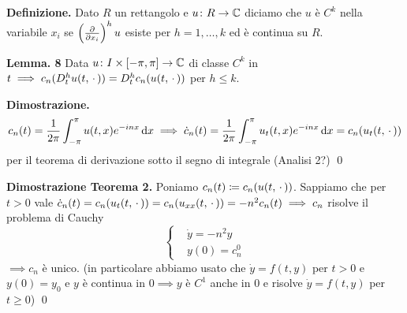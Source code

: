 \textbf{Definizione.}
Dato $R$ un rettangolo e $u \colon R \to \mathbb C$ diciamo che $u$ è $C^k$ nella variabile $x_i$ se $\left(\frac{\partial}{\partial x_i}\right)^h u$ esiste per $h = 1, \dots, k$ ed è continua su $R$.

\textbf{Lemma. 8}
Data $u \colon I \times [-\pi, \pi] \to \mathbb C$ di classe $C^k$ in $t \implies c_n(D_t^h u(t, \,\cdot\,)) = D_t^h c_n(u(t, \,\cdot\,))$ per $h \leq k$.

\textbf{Dimostrazione.}
$$
c_n(t) = \frac{1}{2\pi} \int_{-\pi}^\pi u(t, x) e^{-inx} \,\mathrm{d} x
\implies \dot c_n(t) = \frac{1}{2\pi} \int_{-\pi}^\pi u_t(t, x) e^{-inx} \,\mathrm{d} x = c_n(u_t(t, \,\cdot\,))
$$
per il teorema di derivazione sotto il segno di integrale (Analisi 2?)
\qed

\textbf{Dimostrazione Teorema 2.}
Poniamo $c_n(t) \coloneqq c_n(u(t, \,\cdot\,))$. Sappiamo che per $t > 0$ vale $\dot c_n(t) = c_n(u_t(t, \,\cdot\,)) = c_n(u_{xx}(t, \,\cdot\,)) = -n^2 c_n(t) \implies c_n$ risolve il problema di Cauchy
$$
\left\{
\begin{aligned}
	& \dot y = -n^2 y \\
	& y(0) = c_n^0
\end{aligned}
\right.
$$ 
$\implies c_n$ è unico. (in particolare abbiamo usato che $\dot y = f(t, y)$ per $t > 0$ e $y(0) = y_0$ e $y$ è continua in $0 \implies y$ è $C^1$ anche in $0$ e risolve $\dot y = f(t, y)$ per $t \geq 0$)
\qed










